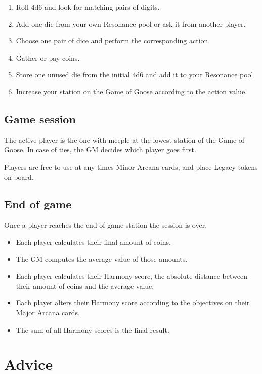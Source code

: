 \documentclass{article}
\begin{document}
\begin{multicols}{2}
\begin{enumerate}
\item Roll 4d6 and look for matching pairs of digits.
\item Add one die from your own Resonance pool or ask it from another player.
\item Choose one pair of dice and perform the corresponding action.
\item Gather or pay coins.
\item Store one unused die from the initial 4d6 and add it to your Resonance pool
\item Increase your station on the Game of Goose according to the action value.
\end{enumerate}

\subsection{Game session}

The active player is the one with meeple at the lowest station of the Game of Goose. In case of ties, the GM decides which player goes first.

Players are free to use at any times Minor Arcana cards, and place Legacy tokens on board.

\subsection{End of game}

Once a player reaches the end-of-game station the session is over.

\begin{itemize}
\item Each player calculates their final amount of coins.
\item The GM computes the average value of those amounts.
\item Each player calculates their Harmony score, the absolute distance between their amount of coins and the average value.
\item Each player alters their Harmony score according to the objectives on their Major Arcana cards.
\item The sum of all Harmony scores is the final result.
\end{itemize}

\section{Advice}


\end{multicols}
\end{document}
